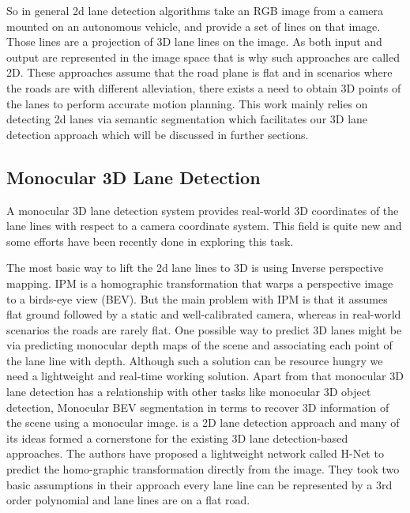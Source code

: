 So in general 2d lane detection algorithms take an RGB image from a camera mounted on an autonomous vehicle, and provide a set of lines on that image. Those lines are a projection of 3D lane lines on the image. As both input and output are represented in the image space that is why such approaches are called 2D. These approaches assume that the road plane is flat and in scenarios where the roads are with different alleviation, there exists a need to obtain 3D points of the lanes to perform accurate motion planning. This work mainly relies on detecting 2d lanes via semantic segmentation which facilitates our 3D lane detection approach which will be discussed in further sections. 
        
        \subsection{Monocular 3D Lane Detection}
        A monocular 3D lane detection system provides real-world 3D coordinates of the lane lines with respect to a camera coordinate system. This field is quite new and some efforts have been recently done in exploring this task. 
 
The most basic way to lift the 2d lane lines to 3D is using Inverse perspective mapping. IPM is a homographic transformation that warps a perspective image to a birds-eye view (BEV). But the main problem with IPM is that it assumes flat ground followed by a static and well-calibrated camera, whereas in real-world scenarios the roads are rarely flat. One possible way to predict 3D lanes might be via predicting monocular depth maps of the scene and associating each point of the lane line with depth. Although such a solution can be resource hungry we need a lightweight and real-time working solution. Apart from that monocular 3D lane detection has a relationship with other tasks like monocular 3D object detection, Monocular BEV segmentation in terms to recover 3D information of the scene using a monocular image.
\cite{DBLP:journals/corr/abs-1802-05591} is a 2D lane detection approach and many of its ideas formed a cornerstone for the existing 3D lane detection-based approaches. The authors have proposed a lightweight network called H-Net to predict the homo-graphic transformation directly from the image. They took two basic assumptions in their approach every lane line can be represented by a 3rd order polynomial and lane lines are on a flat road. 

